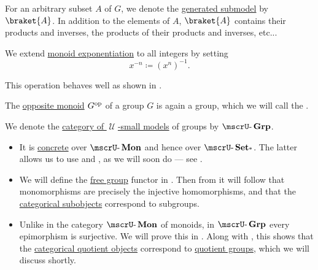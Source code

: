 \begin{definition}
\begin{thmenum}
     For an arbitrary subset \( A \) of \( G \), we denote the \hyperref[def:first_order_generated_substructure]{generated submodel} by \( \braket{ A } \). In addition to the elements of \( A \), \( \braket{ A } \) contains their products and inverses, the products of their products and inverses, etc...

     We extend \hyperref[def:monoid/exponentiation]{monoid exponentiation} to all integers by setting
    \begin{equation*}
      x^{-n} \coloneqq (x^n)^{-1}.
    \end{equation*}

    This operation behaves well as shown in .

     The \hyperref[def:monoid/opposite]{opposite monoid} \( G^{\operatorname{op}} \) of a group \( G \) is again a group, which we will call the .

     We denote the \hyperref[def:category_of_small_first_order_models]{category of \( \mscrU \)-small models} of groups by \( \ucat{Grp} \).

    \begin{itemize}
      \item It is \hyperref[def:concrete_category]{concrete} over \hyperref[def:monoid/category]{\( \ucat{Mon} \)} and hence over \hyperref[def:pointed_set/category]{\( \ucat{Set_*} \)}. The latter allows us to use  and , as we will soon do --- see .

      \item We will define the \hyperref[def:free_group]{free group} functor in . Then from  it will follow that monomorphisms are precisely the injective homomorphisms, and that the \hyperref[def:subobject_and_quotient]{categorical subobjects} correspond to subgroups.

      \item Unlike in the category \hyperref[def:monoid/category]{\( \ucat{Mon} \)} of monoids, in \( \ucat{Grp} \) every epimorphism is surjective. We will prove this in . Along with , this shows that the \hyperref[def:subobject_and_quotient]{categorical quotient objects} correspond to \hyperref[def:group/quotient]{quotient groups}, which we will discuss shortly.


\end{itemize}
\end{thmenum}
\end{definition}
